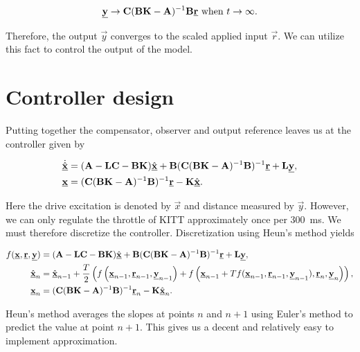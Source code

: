 \documentclass[11pt,titlepage]{report}
\begin{document}
\begin{equation}
	\mathbf{\underline{y}} \to \mathbf{C} (\mathbf{B} \mathbf{K} - \mathbf{A})^{-1} \mathbf{B} \mathbf{\underline{r}} \text{ when } t \to \infty.
\end{equation}

Therefore, the output $\vec{y}$ converges to the scaled applied input $\vec{r}$. We can utilize this fact to control the output of the model.

\section{Controller design}
Putting together the compensator, observer and output reference leaves us at the controller given by

\begin{align}
	\dot{\hat{\mathbf{\underline{x}}}} &= (\mathbf{A}-\mathbf{L}\mathbf{C}-\mathbf{B}\mathbf{K}) \hat{\mathbf{\underline{x}}} + \mathbf{B}(\mathbf{C}(\mathbf{B} \mathbf{K} - \mathbf{A})^{-1} \mathbf{B})^{-1} \mathbf{\underline{r}} + \mathbf{L} \mathbf{\underline{y}}, \\
	\mathbf{\underline{x}} &= (\mathbf{C}(\mathbf{B} \mathbf{K} - \mathbf{A})^{-1} \mathbf{B})^{-1} \mathbf{\underline{r}} - \mathbf{K} \hat{\mathbf{\underline{x}}}.
\end{align}

Here the drive excitation is denoted by $\vec{x}$ and distance measured by $\vec{y}$. However, we can only regulate the throttle of KITT approximately once per \SI{300}{ms}. We must therefore discretize the controller. Discretization using Heun's method \cite{wikipedia-heuns} yields

\begin{align}
	f(\mathbf{\underline{x}},\mathbf{\underline{r}},\mathbf{\underline{y}}) &= (\mathbf{A}-\mathbf{L}\mathbf{C}-\mathbf{B}\mathbf{K}) \hat{\mathbf{\underline{x}}} + \mathbf{B}(\mathbf{C}(\mathbf{B} \mathbf{K} - \mathbf{A})^{-1} \mathbf{B})^{-1} \mathbf{\underline{r}} + \mathbf{L} \mathbf{\underline{y}}, \\
	\hat{\mathbf{\underline{x}}}_n &= \hat{\mathbf{\underline{x}}}_{n-1} + \frac{T}{2} \left( f\left(\mathbf{\underline{x}}_{n-1},\mathbf{\underline{r}}_{n-1},\mathbf{\underline{y}}_{n-1} \right) + f\left( \mathbf{\underline{x}}_{n-1} + T f(\mathbf{\underline{x}}_{n-1},\mathbf{\underline{r}}_{n-1},\mathbf{\underline{y}}_{n-1}),\mathbf{\underline{r}}_{n},\mathbf{\underline{y}}_{n}\right) \right), \\
	\mathbf{\underline{x}}_n &= (\mathbf{C}(\mathbf{B} \mathbf{K} - \mathbf{A})^{-1} \mathbf{B})^{-1} \mathbf{\underline{r}}_n - \mathbf{K} \hat{\mathbf{\underline{x}}}_n.
\end{align}

Heun's method averages the slopes at points $n$ and $n+1$ using Euler's method to predict the value at point $n+1$. This gives us a decent and relatively easy to implement approximation.
\end{document}

